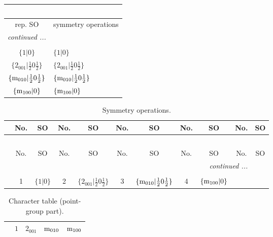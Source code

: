 \documentclass[fleqn,10pt,landscape]{article}
\begin{document}
\begin{itemize}
\begin{center}
\begin{longtable}{c|l}
\multicolumn{1}{l}{\tablename\ \thetable{}} \\
 \hline \hline
rep. SO & symmetry operations \\ \hline \endhead

 \hline \hline
\multicolumn{1}{r}{\footnotesize\it continued ...} \\ \endfoot

 \hline \hline
\multicolumn{1}{r}{} \\ \endlastfoot

$\{1|0\}$ & $\{1|0\}$ \\ \hline
$\{2{}_{001}|\frac{1}{2} 0 \frac{1}{2}\}$ & $\{2{}_{001}|\frac{1}{2} 0 \frac{1}{2}\}$ \\ \hline
$\{{\rm m}_{010}|\frac{1}{2} 0 \frac{1}{2}\}$ & $\{{\rm m}_{010}|\frac{1}{2} 0 \frac{1}{2}\}$ \\ \hline
$\{{\rm m}_{100}|0\}$ & $\{{\rm m}_{100}|0\}$ \\
\end{longtable}
\end{center}
\begin{center}
\renewcommand{\arraystretch}{1.3}
\begin{longtable}{c|cc|cc|cc|cc|cc}
\caption{Symmetry operations.}
 \\
 \hline \hline
 & No. & SO & No. & SO & No. & SO & No. & SO & No. & SO \\ \hline \endfirsthead

\multicolumn{10}{l}{\tablename\ \thetable{}} \\
 \hline \hline
 & No. & SO & No. & SO & No. & SO & No. & SO & No. & SO \\ \hline \endhead

 \hline \hline
\multicolumn{10}{r}{\footnotesize\it continued ...} \\ \endfoot

 \hline \hline
\multicolumn{10}{r}{} \\ \endlastfoot

 & 1 & $\{1|0\}$ & 2 & $\{2{}_{001}|\frac{1}{2} 0 \frac{1}{2}\}$ & 3 & $\{{\rm m}_{010}|\frac{1}{2} 0 \frac{1}{2}\}$ & 4 & $\{{\rm m}_{100}|0\}$ \\
\end{longtable}
\end{center}
\begin{center}
\renewcommand{\arraystretch}{1.0}
\begin{longtable}{c|rrrr}
\caption{Character table (point-group part).}
 \\
 \hline \hline
 & $ 1 $ & $ 2{}_{001} $ & $ {\rm m}_{010} $ & $ {\rm m}_{100} $ \\ \hline \endfirsthead


\end{longtable}
\end{center}
\end{itemize}
\end{document}
